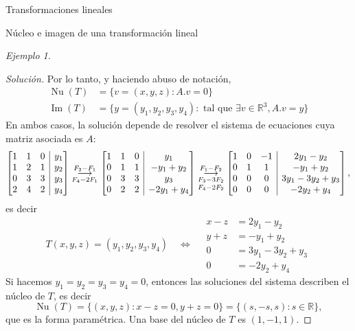 \documentclass[a4paper,12pt,twoside,spanish,reqno]{amsbook}
\numberwithin{equation}{section}
\theoremstyle{definition}
\theoremstyle{remark}
\newtheorem*{ejemplo*}{Ejemplo}
\newcommand{\img}{\operatorname{Im}}
\newcommand{\nuc}{\operatorname{Nu}}
\newcommand{\R}{\mathbb R}
\begin{document}
\begin{chapter}{Transformaciones lineales}
\begin{section}{Núcleo e imagen de una transformación lineal}
\begin{ejemplo*}
\begin{proof}[Solución]
        
        Por lo tanto, y haciendo abuso de notación,  
        \begin{align*}
        \nuc(T) &= \{v=(x,y,z):   A.{v}=0\}\\
        \img(T) &= \{y= (y_1,y_2,y_3,y_4): \text{ tal que } \exists v \in \R^3, A.{v} = {y}  \}
        \end{align*}
        En  ambos casos, la solución depende de resolver el sistema de ecuaciones cuya matriz asociada es $A$:
        \begin{equation*}
        \left[\begin{array}{@{}*{3}{c}|c@{}}1&1&0&y_1\\1&2&1&y_2\\0&3&3&y_3\\2&4&2&y_4 \end{array}\right]
        \underset{F_4-2F_1}{\stackrel{F_2 -F_1}{\longrightarrow}} 
        \left[\begin{array}{@{}*{3}{c}|c@{}}1&1&0&y_1\\0&1&1&-y_1+y_2\\0&3&3&y_3\\0&2&2&-2y_1 +y_4 \end{array}\right]
        \underset{F_4-2F_2}{\underset{F_3-3F_2}{\stackrel{F_1 -F_2}{\longrightarrow}} }
        \left[\begin{array}{@{}*{3}{c}|c@{}}1&0&-1&2y_1-y_2\\0&1&1&-y_1+y_2\\0&0&0&3y_1-3y_2+y_3\\0&0&0&-2y_2 +y_4 \end{array}\right],
        \end{equation*}
        es decir
        \begin{equation}\label{eq-gen}
        T(x,y,z) = (y_1,y_2,y_3,y_4) \quad\Leftrightarrow \quad
        \begin{array}{rl}
        x -z &= 2y_1-y_2\\ 
        y +z &= -y_1+y_2\\
        0&=3y_1-3y_2+y_3 \\
        0&= -2y_2 +y_4
        \end{array}
        \end{equation}
        Si hacemos $y_1 = y_2 = y_3 = y_4 = 0$, entonces las soluciones del sistema describen el núcleo de $T$, es decir
        $$
        \nuc(T) = \{(x,y,z):x-z=0, y+z =0 \} = \{(s,-s,s):s \in \R \},
        $$
        que es la forma paramétrica. Una base del núcleo de $T$  es $(1,-1,1)$. 
        

\end{proof}
\end{ejemplo*}
\end{section}
\end{chapter}
\end{document}
